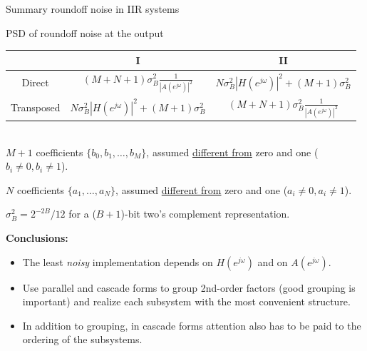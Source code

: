 \documentclass[10pt, handout]{beamer}
\begin{document}
\begin{frame}{Summary roundoff noise in IIR systems}

PSD of roundoff noise at the output
~\\

\begin{tabular}{c||c|c}
	  & I & II \\
	\hline
	Direct & $\displaystyle(M+N+1)\sigma_B^2\frac{1}{|A(e^{j\omega})|^2}$ & $\displaystyle N\sigma_{B}^2|H(e^{j\omega})|^2 + (M+1)\sigma_{B}^2$ \\
	Transposed & $\displaystyle N\sigma_B^2|H(e^{j\omega})|^2 + (M+1)\sigma_B^2$ & $\displaystyle (M+N+1)\sigma_B^2\frac{1}{|A(e^{j\omega})|^2}$ \\
	\hline
\end{tabular}
~\\

$M+1$ coefficients $\{b_0, b_1, \ldots, b_M\}$, assumed \underline{different from} zero and one ($b_i \neq 0, b_i \neq 1$).

$N$ coefficients $\{a_1, \ldots, a_N\}$,  assumed \underline{different from} zero and one ($a_i \neq 0, a_i \neq 1$).

$\sigma_B^2 = 2^{-2B}/12$ for a ($B+1$)-bit two's complement representation.

\vspace{0.5cm}
\textbf{Conclusions:}
\begin{itemize}
	\item The least \textit{noisy} implementation depends on $H(e^{j\omega})$ and on $A(e^{j\omega})$.
	\item Use parallel and cascade forms to group 2nd-order factors (good grouping is important) and realize each subsystem with the most convenient structure.
	\item In addition to grouping, in cascade forms attention also has to be paid to the ordering of the subsystems.
\end{itemize}
\end{frame}
\end{document}
